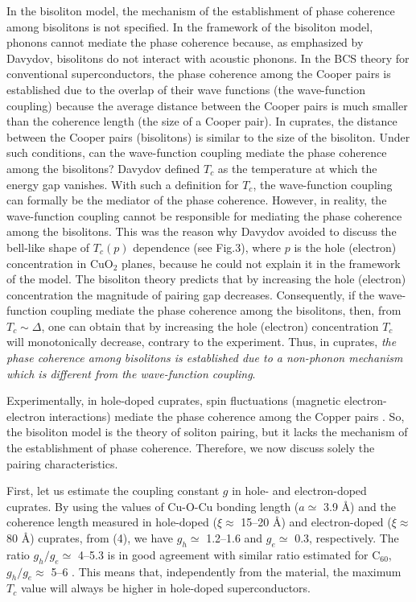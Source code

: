 In the bisoliton model, the mechanism of the establishment of phase 
coherence 
among bisolitons is not specified. In the framework of the bisoliton model, 
phonons cannot mediate the phase coherence because, as emphasized by 
Davydov, bisolitons do not interact with acoustic phonons. In the BCS 
theory for conventional superconductors, the phase coherence among the
Cooper pairs is established due to the overlap of their wave functions (the 
wave-function coupling) because the average distance between the Cooper 
pairs is much smaller than the coherence length (the size of a Cooper pair). 
In cuprates, the distance between the Cooper pairs (bisolitons) is similar to 
the size of the bisoliton. Under such conditions, can the wave-function 
coupling mediate the phase coherence among 
the bisolitons? Davydov defined $T_{c}$ as the temperature at which the 
energy gap vanishes. With such a definition for $T_{c}$, the wave-function 
coupling can formally be the mediator of the phase coherence. 
However, in reality, the wave-function coupling cannot be responsible for 
mediating the phase coherence among the bisolitons. This was the reason 
why Davydov avoided to discuss the bell-like shape of $T_{c}(p)$ dependence
(see Fig.3), where $p$ is the hole (electron) concentration in CuO$_{2}$ 
planes, because he could not explain it in the framework of the model. The 
bisoliton theory predicts that by increasing the hole (electron) 
concentration the magnitude of pairing gap decreases. Consequently, if 
the wave-function coupling mediate the phase coherence among the 
bisolitons, then, from $T_{c} \sim \Delta$, one can obtain that by 
increasing the hole (electron) concentration $T_{c}$ will monotonically 
decrease, contrary to the experiment. Thus, in cuprates, {\em the 
phase coherence among bisolitons is established due to a non-phonon 
mechanism which is different from the wave-function coupling}.
 
Experimentally, in hole-doped cuprates, spin fluctuations (magnetic 
electron-electron interactions) mediate the phase coherence among the Copper 
pairs \cite{AMour1,AMour9}. So, the bisoliton model is the theory of 
soliton pairing, but it lacks the mechanism of the establishment of phase 
coherence. Therefore, we now discuss solely the pairing characteristics. 

First, let us estimate the coupling constant $g$ in hole- and electron-doped
cuprates. By using the values of Cu-O-Cu bonding length 
($a \simeq$ 3.9 \AA) and the coherence length measured in 
hole-doped ($\xi \approx$ 15--20 \AA) and electron-doped 
($\xi \approx$ 80 \AA) cuprates, from (4), we have $g_{h} \simeq$ 
1.2--1.6 and $g_{e} \simeq$ 0.3, respectively. The ratio $g_{h}/g_{e} 
\simeq$ 4--5.3 is in good agreement with similar ratio estimated for 
C$_{60}$, $g_{h}/g_{e} \approx$ 5--6 \cite{Batlog}. This means that, 
independently from the material, the maximum $T_{c}$ value will 
always be higher in hole-doped superconductors.

